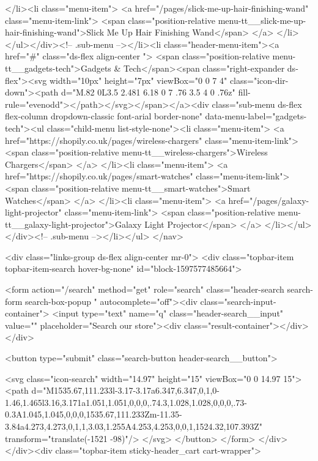 {{{{{                  </li><li class="menu-item">
                    <a href="/pages/slick-me-up-hair-finishing-wand" class="menu-item-link">
                      <span class="position-relative menu-tt__slick-me-up-hair-finishing-wand">Slick Me Up Hair Finishing Wand</span>
                    </a>
                  </li></ul></div><!-- .sub-menu --></li><li class="header-menu-item"><a href="#" class="ds-flex align-center ">
          <span class="position-relative menu-tt__gadgets-tech">Gadgets & Tech</span><span class="right-expander ds-flex"><svg width="10px" height="7px" viewBox="0 0 7 4" class="icon-dir-down"><path d="M.82 0L3.5 2.481 6.18 0 7 .76 3.5 4 0 .76z" fill-rule="evenodd"></path></svg></span></a><div class="sub-menu ds-flex flex-column dropdown-classic font-arial border-none" data-menu-label="gadgets-tech"><ul class="child-menu list-style-none"><li class="menu-item">
                    <a href="https://shopily.co.uk/pages/wireless-chargers" class="menu-item-link">
                      <span class="position-relative menu-tt__wireless-chargers">Wireless Chargers</span>
                    </a>
                  </li><li class="menu-item">
                    <a href="https://shopily.co.uk/pages/smart-watches" class="menu-item-link">
                      <span class="position-relative menu-tt__smart-watches">Smart Watches</span>
                    </a>
                  </li><li class="menu-item">
                    <a href="/pages/galaxy-light-projector" class="menu-item-link">
                      <span class="position-relative menu-tt__galaxy-light-projector">Galaxy Light Projector</span>
                    </a>
                  </li></ul></div><!-- .sub-menu --></li></ul>
</nav>

    <div class="links-group ds-flex align-center mr-0">
<div class="topbar-item topbar-item-search hover-bg-none" id="block-1597577485664">
  
<form action="/search" method="get" role="search" class="header-search search-form search-box-popup " autocomplete="off"><div class="search-input-container">
    <input type="text" name="q" class="header-search__input" value=""
      placeholder="Search our store"><div class="result-container"></div></div>

  <button type="submit" class="search-button header-search__button">
    
<svg class="icon-search" width="14.97" height="15" viewBox="0 0 14.97 15">
<path d="M1535.67,111.233l-3.17-3.17a6.347,6.347,0,1,0-1.46,1.465l3.16,3.171a1.051,1.051,0,0,0,.74.3,1.028,1.028,0,0,0,.73-0.3A1.045,1.045,0,0,0,1535.67,111.233Zm-11.35-3.84a4.273,4.273,0,1,1,3.03,1.255A4.253,4.253,0,0,1,1524.32,107.393Z" transform="translate(-1521 -98)"/>
</svg>
</button>
</form>
</div>
</div><div class="topbar-item sticky-header_cart cart-wrapper">
        
}}}}}
